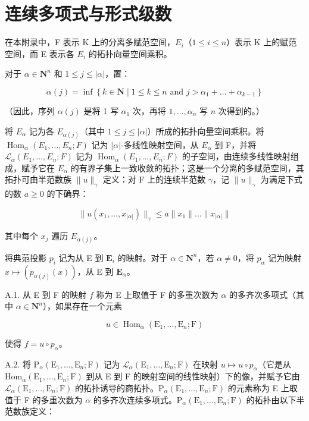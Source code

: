 \chapter{连续多项式与形式级数}

在本附录中，F 表示 K 上的分离多赋范空间，\(E_{i}\)（\(1 \leqslant i \leqslant n\)）表示 K 上的赋范空间，而 E 表示各 \(E_{i}\) 的拓扑向量空间乘积。

对于 \(\alpha \in \mathbf{N}^n\) 和 \(1 \leqslant j \leqslant |\alpha|\)，置：

\[
\alpha (j) = \inf \left\{k \in \mathbf {N} \mid 1 \leqslant k \leqslant n \text { and } j > \alpha_ {1} + \dots + \alpha_ {k - 1} \right\}
\]

（因此，序列 \(\alpha(j)\) 是将 1 写 \(\alpha_{1}\) 次，再将 \(1,\ldots,\alpha_{n}\) 写 \(n\) 次得到的。）

将 \(E_{\alpha}\) 记为各 \(E_{\alpha(j)}\)（其中 \(1 \leqslant j \leqslant |\alpha| \)）所成的拓扑向量空间乘积。将 \(\operatorname{Hom}_{\alpha}(E_1, \ldots, E_n; F)\) 记为 \(|\alpha|\)-多线性映射空间，从 \(E_{\alpha}\) 到 F，并将 \(\mathcal{L}_{\alpha}(E_1, \ldots, E_n; F)\) 记为 \(\operatorname{Hom}_{\alpha}(E_1, \ldots, E_n; F)\) 的子空间，由连续多线性映射组成，赋予它在 \(E_{\alpha}\) 的有界子集上一致收敛的拓扑；这是一个分离的多赋范空间，其拓扑可由半范数族 \(\| u \|_{\gamma}\) 定义：对 F 上的连续半范数 \(\gamma\)，记 \(\| u \|_{\gamma}\) 为满足下式的数 \(a \geqslant 0\) 的下确界：

\[
\| u (x _ {1}, \dots , x _ {| \alpha |}) \| _ {\gamma} \leqslant a \| x _ {1} \| \dots \| x _ {| \alpha |} \|
\]

其中每个 \(x_{j}\) 遍历 \(E_{\alpha(j)}\)。

将典范投影 \(p_{i}\) 记为从 E 到 \(\mathbf{E}_{i}\) 的映射。对于 \(\alpha\in\mathbf{N}^{n}\)，若 \(\alpha\neq0\)，将 \(p_{\alpha}\) 记为映射 \(x\mapsto(p_{\alpha(j)}(x))\)，从 E 到 \(\mathbf{E}_{\alpha}\)。

A.1. 从 E 到 F 的映射 \(f\) 称为 E 上取值于 F 的多重次数为 \(\alpha\) 的多齐次多项式（其中 \(\alpha \in \mathbf{N}^{n}\)），如果存在一个元素

\[
u \in \operatorname{Hom} _ {\alpha} (\mathrm{E} _ {1}, \dots , \mathrm{E} _ {n}; \mathrm{F})
\]

使得 \(f = u \circ p_{\alpha}\)。

A.2. 将 \(\mathrm{P}_{\alpha}(\mathrm{E}_{1},\ldots,\mathrm{E}_{n};\mathrm{F})\) 记为 \(\mathcal{L}_{\alpha}(\mathrm{E}_{1},\ldots,\mathrm{E}_{n};\mathrm{F})\) 在映射 \(u\mapsto u\circ p_{\alpha}\)（它是从 \(\mathrm{Hom}_{\alpha}(\mathrm{E}_{1},\ldots,\mathrm{E}_{n};\mathrm{F})\) 到从 E 到 F 的映射空间的线性映射）下的像，并赋予它由 \(\mathcal{L}_{\alpha}(\mathrm{E}_{1},\ldots,\mathrm{E}_{n};\mathrm{F})\) 的拓扑诱导的商拓扑。\(\mathrm{P}_{\alpha}(\mathrm{E}_{1},\ldots,\mathrm{E}_{n};\mathrm{F})\) 的元素称为 E 上取值于 F 的多重次数为 \(\alpha\) 的多齐次连续多项式。\(\mathrm{P}_{\alpha}(\mathrm{E}_{1},\ldots,\mathrm{E}_{n};\mathrm{F})\) 的拓扑由以下半范数族定义：

